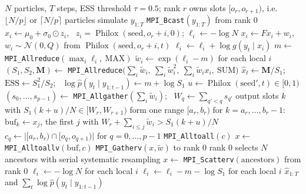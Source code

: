 \documentclass[10pt]{article}
\newcommand{\mpi}[1]{\texttt{\small #1}}
\newcommand{\Phil}{\operatorname{Philox}}
\begin{document}
\begin{algorithm}[H]
\caption{Bootstrap particle filter with MPI, executed by rank $r$ of $p$}
\begin{algorithmic}[1]
\Require $N$ particles, $T$ steps, ESS threshold $\tau = 0.5$; rank $r$ owns slots $[o_r, o_{r+1})$, i.e.\ $\lfloor N/p \rfloor$ or $\lceil N/p \rceil$ particles
 simulate $y_{1:T}$ \EndIf
\State \mpi{MPI\_Bcast}$(y_{1:T})$ from rank 0 
 
  \State $x_i \gets \mu_0 + \sigma_0 \odot z_i$, \ $z_i = \Phil(\text{seed}, o_r + i, 0)$; \quad $\ell_i \gets -\log N$
\EndFor
{}
   
    \State $x_i \gets F x_i + w_i$, \ $w_i \sim \mathcal{N}(0, Q)$ from $\Phil(\text{seed}, o_r + i, t)$
    \State $\ell_i \gets \ell_i + \log g(y_t \mid x_i)$
  \EndFor
  \State $m \gets$ \mpi{MPI\_Allreduce}$(\max_i \ell_i,\ \text{MAX})$ 
  \State $\tilde w_i \gets \exp(\ell_i - m)$ for each local $i$
  \State $(S_1, S_2, \mathbf{M}) \gets$ \mpi{MPI\_Allreduce}$\big(\textstyle\sum_i \tilde w_i,\ \sum_i \tilde w_i^2,\ \sum_i \tilde w_i x_i,\ \text{SUM}\big)$ 
  \State $\hat x_t \gets \mathbf{M} / S_1$; \ $\text{ESS} \gets S_1^2 / S_2$; \ $\log \hat p(y_t \mid y_{1:t-1}) \gets m + \log S_1$ 
   
    \State $u \gets \Phil(\text{seed}', t) \in [0, 1)$ 
      \State $(s_0, \dots, s_{p-1}) \gets$ \mpi{MPI\_Allgather}$(\sum_i \tilde w_i)$; \ $W_q \gets \sum_{q' < q} s_{q'}$ 
      \State output slots $k$ with $S_1 (k + u)/N \in [W_r, W_{r+1})$ form one range $[a_r, b_r)$ 
      \State for $k = a_r, \dots, b_r - 1$: $\text{buf}_k \gets x_j$, the first $j$ with $W_r + \sum_{i \le j} \tilde w_i > S_1 (k+u)/N$
      \State $c_{q} \gets \big|[a_r, b_r) \cap [o_q, o_{q+1})\big|$ for $q = 0, \dots, p-1$
      \State \mpi{MPI\_Alltoall}$(c)$ 
      \State $x \gets$ \mpi{MPI\_Alltoallv}$(\text{buf}, c)$ 
    \Else {}
      \State \mpi{MPI\_Gatherv}$(x, \tilde w)$ to rank 0 
      \State rank 0 selects $N$ ancestors with serial systematic resampling
      \State $x \gets$ \mpi{MPI\_Scatterv}$(\text{ancestors})$ from rank 0 
    \EndIf
    \State $\ell_i \gets -\log N$ for each local $i$
  \Else
    \State $\ell_i \gets \ell_i - m - \log S_1$ for each local $i$ 
  \EndIf
\EndFor
\State \Return $\hat x_{1:T}$ and $\sum_t \log \hat p(y_t \mid y_{1:t-1})$
\end{algorithmic}
\end{algorithm}
\end{document}
